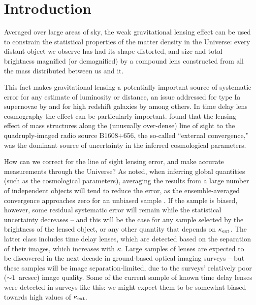 \documentclass[useAMS,usenatbib]{mn2e}
\begin{document}

\section{Introduction}

Averaged over large areas of sky, the weak gravitational lensing effect can be
used to constrain the statistical properties of the matter density in the
Universe: every distant object we observe has had its shape distorted, and size
and total brightness magnified (or demagnified) by a compound lens constructed
from all the mass distributed between us and it.

This fact makes gravitational lensing a potentially important source of
systematic error for any estimate of luminosity or distance, an issue addressed
for \eg type Ia supernovae by \citet[][]{Holz+Wald,Linder+Holz} and for high
redshift galaxies by \citet{Loeb} among others. In time delay lens cosmography
the effect can be particularly important. \citet{Suyu2010} found that  the
lensing effect of mass structures along the (unusually over-dense)  line of
sight to the quadruply-imaged radio source B1608$+$656, the so-called ``external
convergence,'' was the dominant source of uncertainty in the inferred
cosmological parameters. 

How can we correct for the line of sight lensing error, and make accurate
measurements through the Universe? As \citeauthor{LH} noted, when inferring
global quantities (such as the cosmological parameters), averaging the results
from a large number of independent objects will tend to reduce the error, as the
ensemble-averaged convergence approaches zero for an unbiased sample
\citep{xxx}. If the sample is biased, however, some residual systematic error
will remain while the statistical uncertainty decreases -- and this will be the
case for any sample selected by the brightness of the lensed object, or any
other quantity that depends on $\kappa_{\rm ext}$. The latter class includes time delay
lenses, which are detected based on the separation of their images, which
increases with $\kappa$. Large samples of lenses are expected to be discovered
in the next decade in ground-based optical imaging surveys
\citep{Oguri+Marshll2010} -- but these samples will be image separation-limited,
due to the surveys' relatively poor ($\sim 1$~arcsec) image quality. Some of the
current sample of known time delay lenses were detected in surveys like this: we
might expect them to be somewhat biased towards high values of $\kappa_{\rm ext}$.
\end{document}
